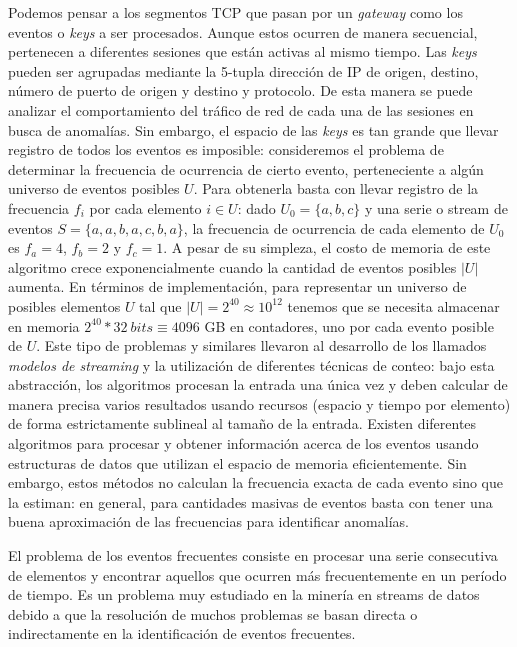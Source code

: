 \documentclass[a4paper,10pt, oneside]{article}
\begin{document}
Podemos pensar a los segmentos TCP que pasan por un \textit{gateway} como los eventos o \textit{keys} a ser procesados. Aunque estos ocurren de manera secuencial, pertenecen a diferentes sesiones que están activas al mismo tiempo. Las \textit{keys} pueden ser agrupadas mediante la 5-tupla dirección de IP de origen, destino, número de puerto de origen y destino y protocolo. De esta manera se puede analizar el comportamiento del tráfico de red de cada una de las sesiones en busca de anomalías.
Sin embargo, el espacio de las \textit{keys} es tan grande que llevar registro de todos los eventos es imposible: consideremos el problema de determinar la frecuencia de ocurrencia de cierto evento, perteneciente a algún universo de eventos posibles $U$. Para obtenerla basta con llevar registro de la frecuencia $f_i$ por cada elemento $i \in U$: dado $U_0=\{a,b,c\}$ y una serie o stream de eventos $S=\{a,a,b,a,c,b,a\}$, la frecuencia de ocurrencia de cada elemento de $U_0$ es $f_a=4$, $f_b=2$ y $f_c=1$.  A pesar de su simpleza, el costo de memoria de este algoritmo crece exponencialmente cuando la cantidad de eventos posibles $|U|$ aumenta. En términos de implementación, para representar un universo de posibles elementos $U$ tal que $|U|=2^{40} \approx 10^{12}$ tenemos que se necesita almacenar en memoria $2^{40} * 32 \ bits\equiv 4096$ GB en contadores, uno por cada evento posible de $U$. Este tipo de problemas y similares llevaron al desarrollo de los llamados \textit{modelos de streaming} y la utilización de diferentes técnicas de conteo: bajo esta abstracción, los algoritmos procesan la entrada una única vez y deben calcular de manera precisa varios resultados usando recursos (espacio y tiempo por elemento) de forma estrictamente sublineal al tamaño de la entrada\cite{Muthukrishnan:2005:DSA:1166409.1166410}. Existen diferentes algoritmos para procesar y obtener información acerca de los eventos usando estructuras de datos que utilizan el espacio de memoria eficientemente. Sin embargo, estos métodos no calculan la frecuencia exacta de cada evento sino que la estiman: en general, para cantidades masivas de eventos basta con tener una buena aproximación de las frecuencias para identificar anomalías.

El problema de los eventos frecuentes consiste en procesar una serie consecutiva de elementos y encontrar aquellos que ocurren más frecuentemente en un período de tiempo. Es un problema muy estudiado en la minería en streams de datos debido a que la resolución de muchos problemas se basan directa o indirectamente en la identificación de eventos frecuentes.
\end{document}
